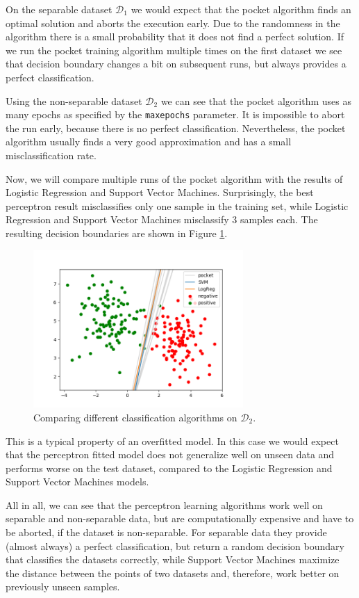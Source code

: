 \documentclass{support/acm_proc_article-sp}
\begin{document}
    On the separable dataset $\mathcal{D}_1$ we would expect that the pocket algorithm finds an optimal solution and
    aborts the execution early.
    Due to the randomness in the algorithm there is a small probability that it does not find a perfect solution.
    If we run the pocket training algorithm multiple times on the first dataset we see that decision boundary changes
    a bit on subsequent runs, but always provides a perfect classification.

    Using the non-separable dataset $\mathcal{D}_2$ we can see that the pocket algorithm uses as many epochs as specified
    by the \lstinline{maxepochs} parameter.
    It is impossible to abort the run early, because there is no perfect classification.
    Nevertheless, the pocket algorithm usually finds a very good approximation and has a small misclassification rate.

    Now, we will compare multiple runs of the pocket algorithm with the results of Logistic Regression and Support
    Vector Machines.
    Surprisingly, the best perceptron result misclassifies only one sample in the training set, while Logistic Regression
    and Support Vector Machines misclassify 3 samples each.
    The resulting decision boundaries are shown in Figure \ref{fig:perceptron-classification}.
    \begin{figure}[!htbp]
        \centering
        \includegraphics[width=8cm]{images/perceptron-classification.png}
        \caption{Comparing different classification algorithms on $\mathcal{D}_2$.}
        \label{fig:perceptron-classification}
    \end{figure}
    This is a typical property of an overfitted model.
    In this case we would expect that the perceptron fitted model does not generalize well on unseen data and performs
    worse on the test dataset, compared to the Logistic Regression and Support Vector Machines models.

    All in all, we can see that the perceptron learning algorithms work well on separable and non-separable data,
    but are computationally expensive and have to be aborted, if the dataset is non-separable.
    For separable data they provide (almost always) a perfect classification, but return a random decision boundary
    that classifies the datasets correctly, while Support Vector Machines maximize the distance between the points of
    two datasets and, therefore, work better on previously unseen samples.
\end{document}
